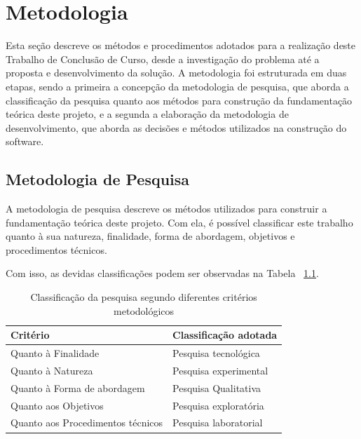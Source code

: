 \chapter[Metodologia]{Metodologia}

Esta seção descreve os métodos e procedimentos adotados para a realização deste Trabalho de Conclusão de Curso, desde a investigação do problema até a proposta e desenvolvimento da solução. A metodologia foi estruturada em duas etapas, sendo a primeira a concepção da metodologia de pesquisa, que aborda a classificação da pesquisa quanto aos métodos para construção da fundamentação teórica deste projeto, e a segunda a elaboração da metodologia de desenvolvimento, que aborda as decisões e métodos utilizados na construção do software.

\section{Metodologia de Pesquisa}

A metodologia de pesquisa descreve os métodos utilizados para construir a fundamentação teórica deste projeto. Com ela, é possível classificar este trabalho quanto à sua natureza, finalidade, forma de abordagem, objetivos e procedimentos técnicos.

Com isso, as devidas classificações podem ser observadas na Tabela ~\ref{tab:classificacao_pesquisa}.

\setlength{\extrarowheight}{5pt}

\begin{table}[H]
\centering
\caption{Classificação da pesquisa segundo diferentes critérios metodológicos}
\label{tab:classificacao_pesquisa}
\begin{tabular}{|p{5cm}|p{8cm}|}
\hline
\textbf{Critério}                & \textbf{Classificação adotada}                                 \\ \hline
Quanto à Finalidade                       & Pesquisa tecnológica                                  \\ \hline
Quanto à Natureza                         & Pesquisa experimental                                 \\ \hline
Quanto à Forma de abordagem               & Pesquisa Qualitativa                                  \\ \hline
Quanto aos Objetivos                      & Pesquisa exploratória                                 \\ \hline
Quanto aos Procedimentos técnicos         & Pesquisa laboratorial                                 \\ \hline
\end{tabular}
\end{table}

